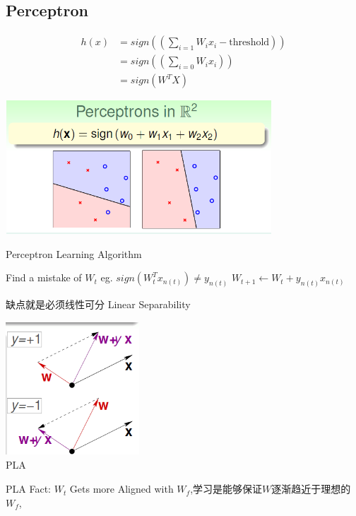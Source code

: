 \documentclass{article}
\begin{document}
\subsection{Perceptron}
\begin{align*}
h(x) &= sign((\sum_{i=1} W_i x_i - \text{threshold})) \\
     &= sign((\sum_{i=0} W_i x_i)) \\
     &= sign(W^TX)
\end{align*}
\begin{center}
\includegraphics[width=10cm, height=5cm]{lecture2_1}\\
\end{center}
\begin{algorithm}  
\caption{Perceptron Learning Algorithm}  
\begin{algorithmic}  
  \STATE Find a \textcolor{Mycolor1}{mistake} of $W_t$
  \STATE eg. $sign(W_{t}^{T}x_{n(t)}) \neq y_{n(t)}$ 
  \STATE $W_{t+1} \gets W_{t} + y_{n(t)}x_{n(t)}$ 
\ENDFOR
\end{algorithmic}  
\end{algorithm}
缺点就是必须线性可分 Linear Separability \par
\begin{center}
\includegraphics[width=5cm, height=5cm]{lecture2_2}\\
PLA \par
\end{center}
PLA Fact: $W_t$ Gets more Aligned with $W_f$,学习是能够保证$W$逐渐趋近于理想的$W_f$,
\end{document}
